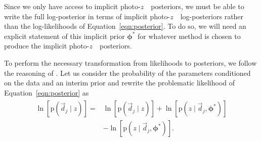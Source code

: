 \documentclass[iop]{emulateapj}
\newcommand{\Eq}[1]{Equation~\ref{#1}}
\newcommand{\data}{\ensuremath{\vec{d}}}
\newcommand{\pr}[1]{\ensuremath{\mathrm{p}(#1)}}
\newcommand{\gvn}{\mid}%
\newcommand{\pz}{photo-$z$~}
\newcommand{\bvec}[1]{\ensuremath{\boldsymbol{#1}}}
\newcommand{\ndphi}{\bvec{\phi}}
\begin{document}
Since we only have access to implicit \pz\ posteriors, we must be able to write the full log-posterior in terms of implicit \pz\ log-posteriors rather than the log-likelihoods of \Eq{eqn:posterior}.
To do so, we will need an explicit statement of this implicit prior $\ndphi^{*}$ for whatever method is chosen to produce the implicit \pz\ posteriors.  

To perform the necessary transformation from likelihoods to posteriors, we follow the reasoning of \citet{foreman-mackey_exoplanet_2014}.  
Let us consider the probability of the parameters conditioned on the data and an interim prior and rewrite the problematic likelihood of \Eq{eqn:posterior} as 
\begin{align}
\label{eqn:trick}
\begin{split}
\ln[\pr{\data_{j} \gvn z}] = & \ln[\pr{\data_{j} \gvn z}] + \ln[\pr{z \gvn \data_{j}, \ndphi^{*}}]\\
 & - \ln[\pr{z \gvn \data_{j}, \ndphi^{*}}].
 \end{split}
\end{align}
\end{document}
